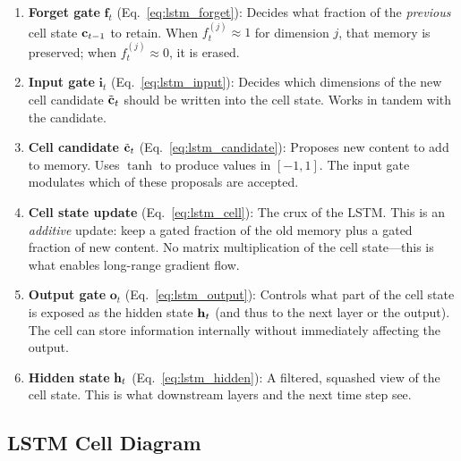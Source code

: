 \begin{enumerate}[leftmargin=*]
\item \textbf{Forget gate} $\mathbf{f}_t$ (Eq.~\ref{eq:lstm_forget}):
  Decides what fraction of the \emph{previous} cell state $\mathbf{c}_{t-1}$ to
  retain.  When $f_t^{(j)} \approx 1$ for dimension $j$, that memory is
  preserved; when $f_t^{(j)} \approx 0$, it is erased.

\item \textbf{Input gate} $\mathbf{i}_t$ (Eq.~\ref{eq:lstm_input}):
  Decides which dimensions of the new cell candidate $\tilde{\mathbf{c}}_t$ should
  be written into the cell state.  Works in tandem with the candidate.

\item \textbf{Cell candidate} $\tilde{\mathbf{c}}_t$ (Eq.~\ref{eq:lstm_candidate}):
  Proposes new content to add to memory.  Uses $\tanh$ to produce values in
  $[-1, 1]$.  The input gate modulates which of these proposals are accepted.

\item \textbf{Cell state update} (Eq.~\ref{eq:lstm_cell}):
  The crux of the LSTM.  This is an \emph{additive} update:
  keep a gated fraction of the old memory plus a gated fraction of new
  content.  No matrix multiplication of the cell state---this is what
  enables long-range gradient flow.

\item \textbf{Output gate} $\mathbf{o}_t$ (Eq.~\ref{eq:lstm_output}):
  Controls what part of the cell state is exposed as the hidden state
  $\mathbf{h}_t$ (and thus to the next layer or the output).  The cell can store
  information internally without immediately affecting the output.

\item \textbf{Hidden state} $\mathbf{h}_t$ (Eq.~\ref{eq:lstm_hidden}):
  A filtered, squashed view of the cell state.  This is what downstream
  layers and the next time step see.
\end{enumerate}

\subsection{LSTM Cell Diagram}

